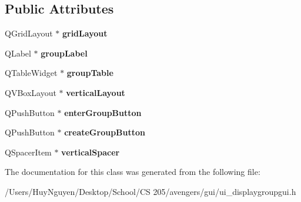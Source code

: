 \subsection*{Public Attributes}
\begin{DoxyCompactItemize}
\item 
Q\+Grid\+Layout $\ast$ {\bfseries grid\+Layout}\hypertarget{classUi__DisplayGroupGUI_ab2c5ba8ae44773e40c1dfdf7659df038}{}\label{classUi__DisplayGroupGUI_ab2c5ba8ae44773e40c1dfdf7659df038}

\item 
Q\+Label $\ast$ {\bfseries group\+Label}\hypertarget{classUi__DisplayGroupGUI_a4cac0fc5465d0596c307c3461c495a27}{}\label{classUi__DisplayGroupGUI_a4cac0fc5465d0596c307c3461c495a27}

\item 
Q\+Table\+Widget $\ast$ {\bfseries group\+Table}\hypertarget{classUi__DisplayGroupGUI_ac76f38d8c226e38f2d474610af256bd5}{}\label{classUi__DisplayGroupGUI_ac76f38d8c226e38f2d474610af256bd5}

\item 
Q\+V\+Box\+Layout $\ast$ {\bfseries vertical\+Layout}\hypertarget{classUi__DisplayGroupGUI_a05ec67cb1bf801e44703d9552afdff7e}{}\label{classUi__DisplayGroupGUI_a05ec67cb1bf801e44703d9552afdff7e}

\item 
Q\+Push\+Button $\ast$ {\bfseries enter\+Group\+Button}\hypertarget{classUi__DisplayGroupGUI_ab447fbf9767b74ca76bd793305046562}{}\label{classUi__DisplayGroupGUI_ab447fbf9767b74ca76bd793305046562}

\item 
Q\+Push\+Button $\ast$ {\bfseries create\+Group\+Button}\hypertarget{classUi__DisplayGroupGUI_aa8a2013f2a223a7ad52a5a28f58e5c23}{}\label{classUi__DisplayGroupGUI_aa8a2013f2a223a7ad52a5a28f58e5c23}

\item 
Q\+Spacer\+Item $\ast$ {\bfseries vertical\+Spacer}\hypertarget{classUi__DisplayGroupGUI_a466ad6be2e341b29fe74c81d56801af5}{}\label{classUi__DisplayGroupGUI_a466ad6be2e341b29fe74c81d56801af5}

\end{DoxyCompactItemize}


The documentation for this class was generated from the following file\+:\begin{DoxyCompactItemize}
\item 
/\+Users/\+Huy\+Nguyen/\+Desktop/\+School/\+C\+S 205/avengers/gui/ui\+\_\+displaygroupgui.\+h\end{DoxyCompactItemize}
